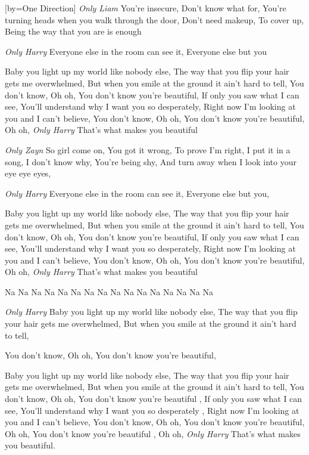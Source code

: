 [by={One Direction}]
\beginverse
\textit{Only Liam}
You're insecure,
Don't know what for,
You're turning heads when you walk through the door,
Don't need makeup,
To cover up,
Being the way that you are is enough
\endverse

\beginverse
\textit{Only Harry}
Everyone else in the room can see it,
Everyone else but you
\endverse

\beginchorus
Baby you light up my world like nobody else,
The way that you flip your hair gets me overwhelmed,
But when you smile at the ground it ain't hard to tell,
You don't know,
Oh oh,
You don't know you're beautiful,
If only you saw what I can see,
You'll understand why I want you so desperately,
Right now I'm looking at you and I can't believe,
You don't know,
Oh oh,
You don't know you're beautiful,
Oh oh,
\textit{Only Harry}
That's what makes you beautiful
\endchorus

\beginverse
\textit{Only Zayn}
So girl come on,
You got it wrong,
To prove I'm right,
I put it in a song,
I don't know why,
You're being shy,
And turn away when I look into your eye eye eyes,
\endverse

\beginverse
\textit{Only Harry}
Everyone else in the room can see it,
Everyone else but you,
\endverse

\beginchorus
Baby you light up my world like nobody else,
The way that you flip your hair gets me overwhelmed,
But when you smile at the ground it ain't hard to tell,
You don't know,
Oh oh,
You don't know you're beautiful,
If only you saw what I can see,
You'll understand why I want you so desperately,
Right now I'm looking at you and I can't believe,
You don't know,
Oh oh,
You don't know you're beautiful,
Oh oh,
\textit{Only Harry}
That's what makes you beautiful
\endchorus

\beginchorus
Na Na Na Na Na Na Na Na Na Na
Na Na Na Na Na Na 
\endchorus

\beginverse
\textit{Only Harry}
Baby you light up my world like nobody else,
The way that you flip your hair gets me overwhelmed,
But when you smile at the ground it ain't hard to tell,
\endverse

\beginchorus
You don't know,
Oh oh,
You don't know you're beautiful,
\endchorus

\beginchorus
Baby you light up my world like nobody else,
The way that you flip your hair gets me overwhelmed,
But when you smile at the ground it ain't hard to tell,
You don't know,
Oh oh,
You don't know you're beautiful ,
If only you saw what I can see,
You'll understand why I want you so desperately ,
Right now I'm looking at you and I can't believe,
You don't know,
Oh oh,
You don't know you're beautiful,
Oh oh,
You don't know you're beautiful ,
Oh oh,
\textit{Only Harry}
That's what makes you beautiful.
\endchorus
\endsong
